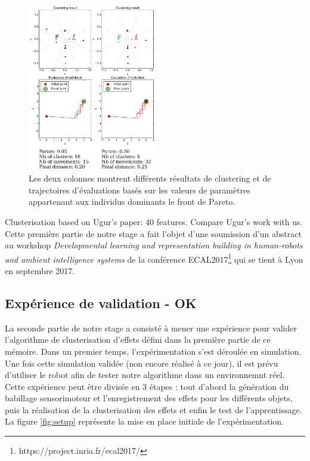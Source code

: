 \documentclass[draft]{llncs}
\begin{document}
\begin{figure}[ht]
  \begin{center}
    \includegraphics[width=0.5\textwidth]{figures/Benchmark_3.pdf}
    \caption{Les deux colonnes montrent différents résultats de clustering et de trajectoires d'évaluations basés sur les valeurs de paramètres appartenant aux individus dominants le front de Pareto.}
    \label{fig:results}
  \end{center}
\end{figure}


Clusterisation based on Ugur's paper: 40 features. Compare Ugur's work with us.\\

Cette première partie de notre stage a fait l'objet d'une soumission d'un abstract au workshop \textit{Developmental learning and representation building in human-robots and ambient intelligence systems} de la conférence ECAL2017\footnote{https://project.inria.fr/ecal2017/} qui se tient à Lyon en septembre 2017.






\subsection{Expérience de validation - OK}
La seconde partie de notre stage a consisté à mener une expérience pour valider l'algorithme de clusterisation d'effets défini dans la première partie de ce mémoire.
Dans un premier temps, l'expérimentation s'est déroulée en simulation.
Une fois cette simulation validée (non encore réalisé à ce jour), il est prévu d'utiliser le robot afin de tester notre algorithme dans un environnemnt réel.
Cette expérience peut être divisée en 3 étapes : tout d'abord la génération du babillage sensorimoteur et l'enregistrement des effets pour les différents objets, puis la réalisation de la clusterisation des effets et enfin le test de l'apprentissage.
La figure \ref{fig:setup} représente la mise en place initiale de l'expérimentation.
\end{document}
